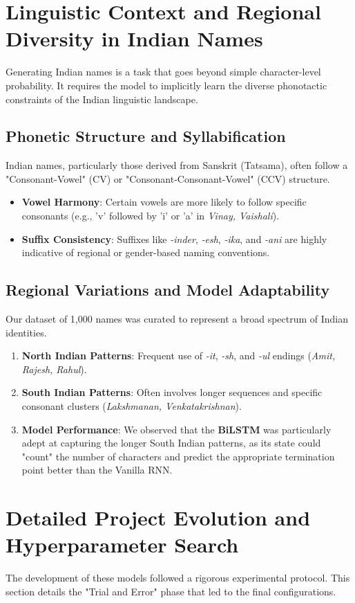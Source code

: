 \documentclass[12pt,a4paper]{article}
\begin{document}
\section{Linguistic Context and Regional Diversity in Indian Names}
Generating Indian names is a task that goes beyond simple character-level probability. It requires the model to implicitly learn the diverse phonotactic constraints of the Indian linguistic landscape.

\subsection{Phonetic Structure and Syllabification}
Indian names, particularly those derived from Sanskrit (Tatsama), often follow a "Consonant-Vowel" (CV) or "Consonant-Consonant-Vowel" (CCV) structure. 
\begin{itemize}
    \item \textbf{Vowel Harmony}: Certain vowels are more likely to follow specific consonants (e.g., 'v' followed by 'i' or 'a' in \textit{Vinay, Vaishali}).
    \item \textbf{Suffix Consistency}: Suffixes like \textit{-inder}, \textit{-esh}, \textit{-ika}, and \textit{-ani} are highly indicative of regional or gender-based naming conventions.
\end{itemize}

\subsection{Regional Variations and Model Adaptability}
Our dataset of 1,000 names was curated to represent a broad spectrum of Indian identities. 
\begin{enumerate}
    \item \textbf{North Indian Patterns}: Frequent use of \textit{-it}, \textit{-sh}, and \textit{-ul} endings (\textit{Amit, Rajesh, Rahul}).
    \item \textbf{South Indian Patterns}: Often involves longer sequences and specific consonant clusters (\textit{Lakshmanan, Venkatakrishnan}).
    \item \textbf{Model Performance}: We observed that the \textbf{BiLSTM} was particularly adept at capturing the longer South Indian patterns, as its state could "count" the number of characters and predict the appropriate termination point better than the Vanilla RNN.
\end{enumerate}

\section{Detailed Project Evolution and Hyperparameter Search}
The development of these models followed a rigorous experimental protocol. This section details the "Trial and Error" phase that led to the final configurations.
\end{document}
